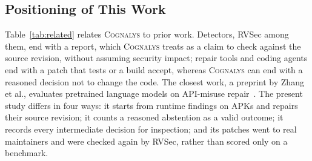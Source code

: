 \documentclass[conference]{IEEEtran}
\newcommand{\system}{\textsc{Cognalys}}
\begin{document}
\subsection{Positioning of This Work}

Table~\ref{tab:related} relates \system{} to prior work. Detectors, RVSec among
them, end with a report, which \system{} treats as a claim to check against the
source revision, without assuming security impact; repair tools and coding
agents end with a patch that tests or a build accept, whereas \system{} can end
with a reasoned decision not to change the code. The closest work, a preprint
by Zhang et al., evaluates pretrained language models on API-misuse
repair~\cite{zhang2023apimisuse}. The present study differs in four ways: it
starts from runtime findings on APKs and repairs their source revision; it
counts a reasoned abstention as a valid outcome; it records every intermediate
decision for inspection; and its patches went to real maintainers and were
checked again by RVSec, rather than scored only on a benchmark.
\end{document}
